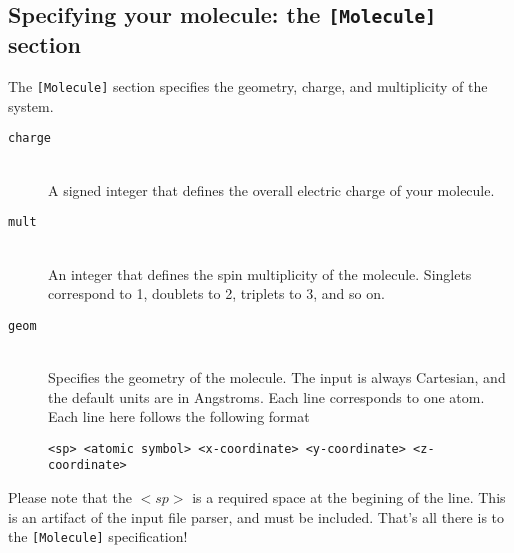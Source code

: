 \documentclass[12pt]{article}
\begin{document}
    \subsection{Specifying your molecule: the \texttt{[Molecule]} section} \label{subsec:MoleculeInput}
    The \texttt{[Molecule]} section specifies the geometry, charge, and multiplicity of the system. 
    \begin{description}
    \item[\texttt{charge}] \hfill \\
    A signed integer that defines the overall electric charge of your molecule.
    \item[\texttt{mult}] \hfill \\
    An integer that defines the spin multiplicity of the molecule. Singlets correspond to 1, doublets to 2, triplets to 3, and so on.
    \item[\texttt{geom}] \hfill \\
    Specifies the geometry of the molecule. The input is always Cartesian, and the default units are in Angstroms. Each line corresponds to one atom. Each line here follows the following format
          \begin{lstlisting}
<sp> <atomic symbol> <x-coordinate> <y-coordinate> <z-coordinate>
          \end{lstlisting} 
    \end{description}
    Please note that the $<sp>$ is a required space at the begining of the line. This is an artifact of the input file parser, and must be included. That's all there is to the \texttt{[Molecule]} specification!
\end{document}
